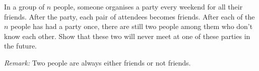 In a group of $n$ people, someone organises a party every weekend for all their friends.
After the party, each pair of attendees becomes friends.
After each of the $n$ people has had a party once,
there are still two people among them who don't know each other.
Show that these two will never meet at one of these parties in the future.

\emph{Remark:} Two people are always either friends or not friends.
